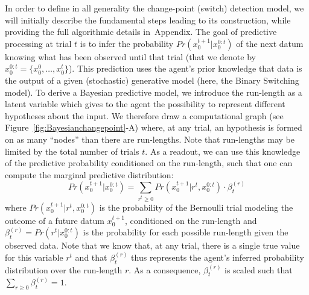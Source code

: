 \documentclass[10pt,letterpaper]{article}
\newcommand{\eql}[1]{\begin{equation}#1\end{equation}}
\newcommand{\seeFig}[1]{Figure~\ref{fig:#1}}
\newcommand{\seeEq}[1]{Equation~\ref{eq:#1}}
\newcommand{\seeApp}[1]{Appendix}
\begin{document}
In order to define in all generality the change-point (switch) detection model,
we will initially describe the fundamental steps leading to its construction,
while providing the full algorithmic details in~\seeApp{bcp}.
The goal of predictive processing at trial $t$
is to infer the probability $Pr(x_0^{t+1} | x_0^{0:t})$ of the next datum
knowing what has been observed until that trial
(that we denote by $x_0^{0:t} = \{ x_0^0, \ldots, x_0^t \}$).
This prediction uses the agent's prior knowledge
that data is the output of a given (stochastic) generative model (here, the Binary Switching model).
To derive a Bayesian predictive model, we introduce
the run-length as a latent variable which gives to the agent the possibility to represent
different hypotheses about the input.
We therefore draw a computational graph (see \seeFig{Bayesianchangepoint}-A) where, at any trial,
an hypothesis is formed on as many ``nodes'' than there are run-lengths.
Note that run-lengths may be limited by the total number of trials $t$.
%
%
As a readout, we can use this knowledge of the predictive probability conditioned on the run-length,
such that one can compute the marginal predictive distribution:
\eql{
Pr(x_0^{t+1} | x_0^{0:t}) =
\sum_{r^{t}\geq 0} Pr(x_0^{t+1} | r^{t}, x_0^{0:t}) \cdot \beta^{(r)}_t
\label{eq:pred}
}
where $Pr(x_0^{t+1} | r^{t}, x_0^{0:t})$ is the probability of
the Bernoulli trial modeling the outcome of a future datum $x_0^{t+1}$,
conditioned on the run-length and
$\beta^{(r)}_t=Pr(r^t | x_0^{0:t})$ is the probability for each possible run-length given the observed data.
Note that we know that, at any trial, there is a single true value for this variable $r^{t}$
and that $\beta^{(r)}_t$ thus represents the agent's inferred probability distribution over the run-length $r$.
As a consequence, $\beta^{(r)}_t$ is scaled such that $\sum_{r \geq 0 } \beta^{(r)}_t = 1$.
\end{document}
